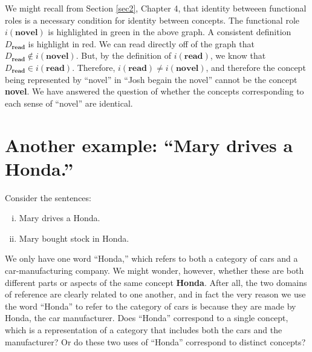 We might recall from Section \ref{sec2}, Chapter 4, that identity betweeen functional roles is a necessary condition for identity between concepts. The functional role $i(\textbf{novel})$ is highlighted in green in the above graph. A consistent definition $D_\textbf{read}$ is highlight in red. We can read directly off of the graph that $D_\textbf{read}\notin i(\textbf{novel})$. But, by the definition of $i(\textbf{read})$, we know that $D_\textbf{read}\in i(\textbf{read})$. Therefore, $i(\textbf{read})\neq i(\textbf{novel})$, and therefore the concept being represented by ``novel'' in ``Josh begain the novel'' cannot be the concept {\bf novel}. We have answered the question of whether the concepts corresponding to each sense of ``novel'' are identical.

\section{Another example: ``Mary drives a Honda.''}

Consider the sentences:
\begin{enumerate}[(i)]
\item Mary drives a Honda.
\item Mary bought stock in Honda.
\end{enumerate}

We only have one word ``Honda,'' which refers to both a category of cars and a car-manufacturing company. We might wonder, however, whether these are both different parts or aspects of the same concept {\bf Honda}. After all, the two domains of reference are clearly related to one another, and in fact the very reason we use the word ``Honda'' to refer to the category of cars is because they are made by Honda, the car manufacturer. Does ``Honda'' correspond to a single concept, which is a representation of a category that includes both the cars and the manufacturer? Or do these two uses of ``Honda'' correspond to distinct concepts?

